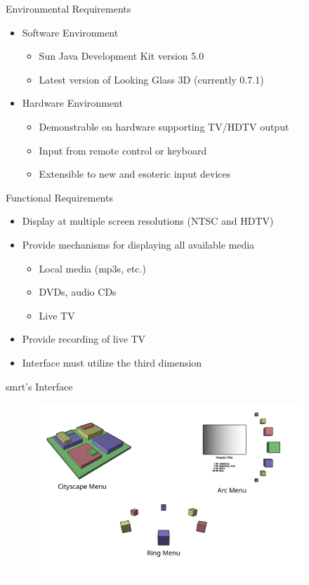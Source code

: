\documentclass[style=smrt,mode=present,paper=screen]{powerdot}
\begin{document}
\begin{slide}{Environmental Requirements}
\begin{itemize}
\item Software Environment
\begin{itemize}
	\item Sun Java Development Kit version 5.0
	\item Latest version of Looking Glass 3D (currently 0.7.1)
\end{itemize}
\item Hardware Environment
\begin{itemize}
	\item Demonstrable on hardware supporting TV/HDTV output
	\item Input from remote control or keyboard
	\item Extensible to new and esoteric input devices
\end{itemize}
\end{itemize}
\end{slide}

\begin{slide}{Functional Requirements}
\begin{itemize}
\item Display at multiple screen resolutions (NTSC and HDTV)
\item Provide mechanisms for displaying all available media
\begin{itemize}
	\item Local media (mp3s, etc.)
	\item DVDs, audio CDs
	\item Live TV
\end{itemize}
\item Provide recording of live TV
\item Interface must utilize the third dimension
\end{itemize}
\end{slide}


\begin{slide}{smrt's Interface}
\begin{figure}[htb]
	\includegraphics[angle=-90,width=4in]{figures/interface}
\end{figure}
\end{slide}
\end{document}

